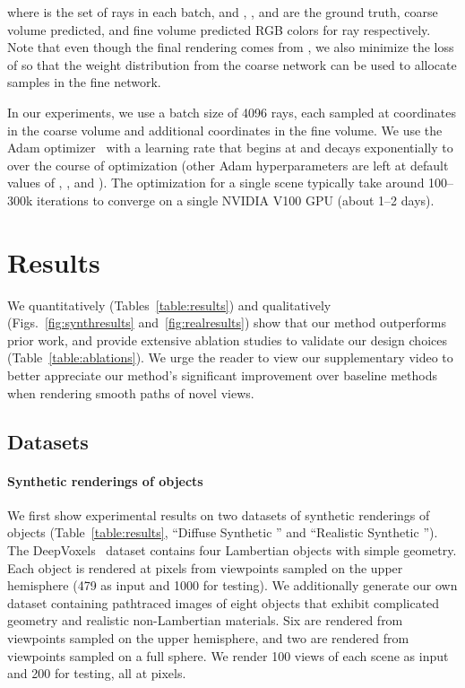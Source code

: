 \documentclass[runningheads]{llncs}
\begin{document}
where  is the set of rays in each batch, and , , and  are the ground truth, coarse volume predicted, and fine volume predicted RGB colors for ray  respectively. Note that even though the final rendering comes from , we also minimize the loss of  so that the weight distribution from the coarse network can be used to allocate samples in the fine network.

In our experiments, we use a batch size of 4096 rays, each sampled at  coordinates in the coarse volume and  additional coordinates in the fine volume. We use the Adam optimizer~\cite{KingmaB15} with a learning rate that begins at  and decays exponentially to  over the course of optimization (other Adam hyperparameters are left at default values of , , and ). The optimization for a single scene typically take around 100--300k iterations to converge on a single NVIDIA V100 GPU (about 1--2 days).

\section{Results}

We quantitatively (Tables~\ref{table:results}) and qualitatively (Figs.~\ref{fig:synthresults} and~\ref{fig:realresults}) show that our method outperforms prior work, and provide extensive ablation studies to validate our design choices (Table~\ref{table:ablations}). We urge the reader to view our supplementary video to better appreciate our method's significant improvement over baseline methods when rendering smooth paths of novel views.

\subsection{Datasets}

\paragraph{\textbf{Synthetic renderings of objects}}
\label{subsec:goodsynth}

We first show experimental results on two datasets of synthetic renderings of objects (Table~\ref{table:results}, ``Diffuse Synthetic '' and ``Realistic Synthetic ''). The DeepVoxels~\cite{deepvoxels} dataset contains four Lambertian objects with simple geometry. Each object is rendered at  pixels from viewpoints sampled on the upper hemisphere (479 as input and 1000 for testing). We additionally generate our own dataset containing pathtraced images of eight objects that exhibit complicated geometry and realistic non-Lambertian materials. Six are rendered from viewpoints sampled on the upper hemisphere, and two are rendered from viewpoints sampled on a full sphere. We render 100 views of each scene as input and 200 for testing, all at  pixels.
\end{document}
